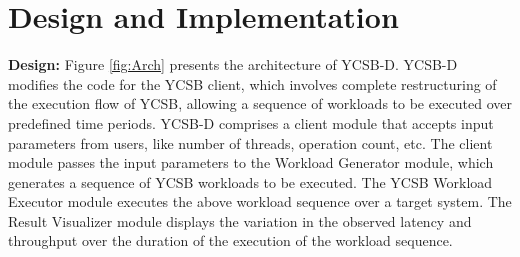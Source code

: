 \documentclass[conference]{IEEEtran}
\begin{document}
\section{Design and Implementation}
 \textbf{Design:} Figure \ref{fig:Arch} presents the architecture of YCSB-D. YCSB-D modifies the code for the YCSB client, which involves complete restructuring of the execution flow of YCSB, allowing a sequence of workloads to be executed over  predefined time periods. YCSB-D comprises a client module that accepts input parameters from users, like number of threads, operation count, etc. The client module passes the input parameters to the Workload Generator module, which generates a sequence of YCSB workloads to be executed. The YCSB Workload Executor module executes the above workload sequence over a target system. The Result Visualizer module displays the variation in the observed latency and throughput over the duration of the execution of the workload sequence.
%
\end{document}
